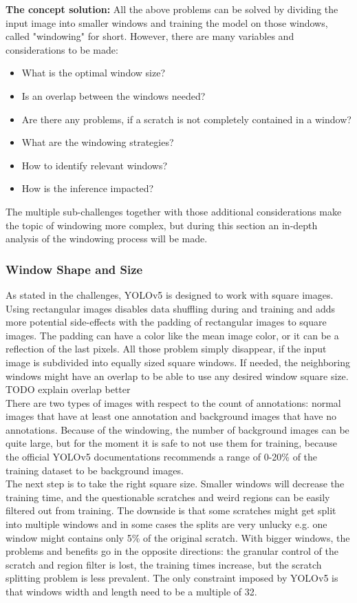 \textbf{The concept solution:} All the above problems can be solved by dividing the input image into smaller windows and training the model on those windows, called "windowing" for short.  However, there are many variables and considerations to be made:
\begin{itemize}
\item What is the optimal window size?
\item Is an overlap between the windows needed?
\item Are there any problems, if a scratch is not completely contained in a window?
\item What are the windowing strategies?
\item How to identify relevant windows?
\item How is the inference impacted?
\end{itemize}
The multiple sub-challenges together with those additional considerations make the topic of windowing more complex, but during this section an in-depth analysis of the windowing process will be made.

\subsubsection{Window Shape and Size}
As stated in the challenges, YOLOv5 is designed to work with square images. Using rectangular images disables data shuffling during and training and adds more potential side-effects with the padding of rectangular images to square images. The padding can have a color like the mean image color, or it can be a reflection of the last pixels. All those problem simply disappear, if the input image is subdivided into equally sized square windows. If needed, the neighboring windows might have an overlap to be able to use any desired window square size. TODO explain overlap better \\
There are two types of images with respect to the count of annotations: normal images that have at least one annotation and background images that have no annotations. Because of the windowing, the number of background images can be quite large, but for the moment it is safe to not use them for training, because the official YOLOv5 documentations recommends a range of 0-20\% of the training dataset to be background images. \\
The next step is to take the right square size. Smaller windows will decrease the training time, and the questionable scratches and weird regions can be easily filtered out from training. The downside is that some scratches might get split into multiple windows and in some cases the splits are very unlucky e.g. one window might contains only 5\% of the original scratch. With bigger windows, the problems and benefits go in the opposite directions: the granular control of the scratch and region filter is lost, the training times increase, but the scratch splitting problem is less prevalent. The only constraint imposed by YOLOv5 is that windows width and length need to be a multiple of 32.\\

